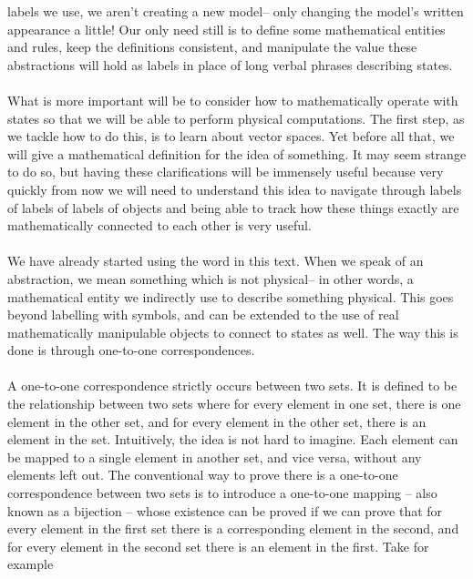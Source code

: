 labels we use, we aren't creating a new model-- only changing the model's written appearance a little! Our only need still is to define some mathematical entities and rules, keep the definitions consistent, and manipulate the value these abstractions will hold as labels in place of long verbal phrases describing states.
\\\\
What is more important will be to consider how to mathematically operate with states so that we will be able to perform physical computations. The first step, as we tackle how to do this, is to learn about vector spaces. Yet before all that, we will give a mathematical definition for the idea of  something. It may seem strange to do so, but having these clarifications will be immensely useful because very quickly from now we will need to understand this idea to navigate through labels of labels of labels of objects and being able to track how these things exactly are mathematically connected to each other is very useful.
\\\\
We have already started using the word  in this text. When we speak of an abstraction, we mean something which is not physical-- in other words, a mathematical entity we indirectly use to describe something physical. This goes beyond labelling with symbols, and can be extended to the use of real mathematically manipulable objects to connect to states as well. The way this is done is through one-to-one correspondences.
\\\\
A one-to-one correspondence strictly occurs between two sets. It is defined to be the relationship between two sets where for every element in one set, there is one element in the other set, and for every element in the other set, there is an element in the set. Intuitively, the idea is not hard to imagine. Each element can be mapped to a single element in another set, and vice versa, without any elements left out. The conventional way to prove there is a one-to-one correspondence between two sets is to introduce a one-to-one mapping -- also known as a bijection -- whose existence can be proved if we can prove that for every element in the first set there is a corresponding element in the second, and for every element in the second set there is an element in the first. Take for example
